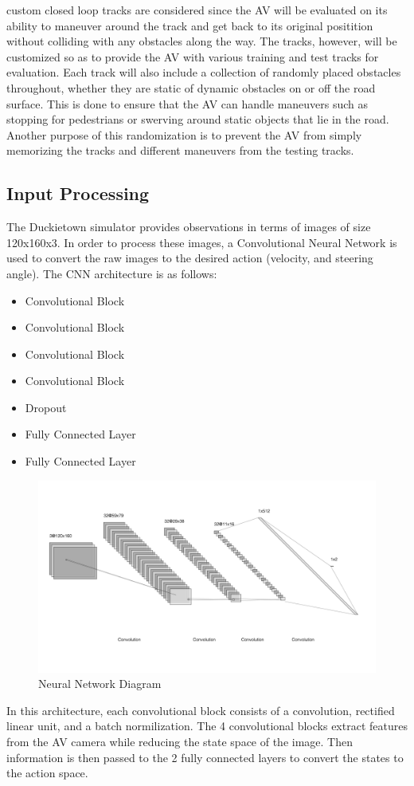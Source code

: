 \documentclass[conference]{IEEEtran}
\begin{document}
custom closed loop tracks are considered since the AV will be evaluated on its ability to maneuver 
around the track and get back to its original positition without colliding with any obstacles along 
the way. The tracks, however, will be customized so as to provide the AV with various training and 
test tracks for evaluation. Each track will also include a collection of randomly placed obstacles 
throughout, whether they are static of dynamic obstacles on or off the road surface. This is done 
to ensure that the AV can handle maneuvers such as stopping for pedestrians or swerving around static 
objects that lie in the road. Another purpose of this randomization is to prevent the AV from simply
memorizing the tracks and different maneuvers from the testing tracks. 

\subsection{Input Processing}
The Duckietown simulator provides observations in terms of images of size 120x160x3. In order to 
process these images, a Convolutional Neural Network is used to convert the raw images to the 
desired action (velocity, and steering angle).
The CNN architecture is as follows: 
\begin{itemize}
  \item Convolutional Block 
  \item Convolutional Block 
  \item Convolutional Block 
  \item Convolutional Block 
  \item Dropout
  \item Fully Connected Layer
  \item Fully Connected Layer
\end{itemize}
\begin{figure}[H]
  \centering
    \includegraphics[scale=0.20]{neural_net.png}
  \caption{Neural Network Diagram}
\end{figure}
In this architecture, each convolutional block consists of a convolution, rectified linear unit, and
a batch normilization. The 4 convolutional blocks extract features from the AV camera while reducing
the state space of the image. Then information is then passed to the 2 fully connected layers to convert 
the states to the action space. 
\end{document}
